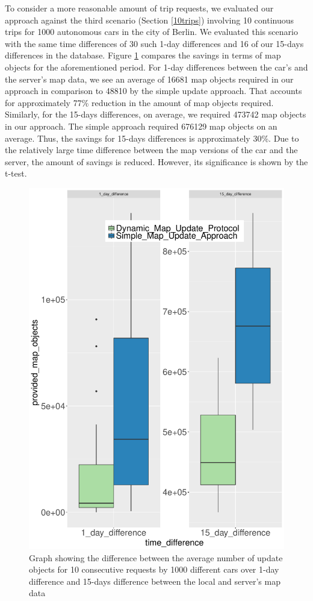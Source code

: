 To consider a more reasonable amount of trip requests, we evaluated our approach against the third scenario (Section \ref{10trips}) involving 10 continuous trips for 1000 autonomous cars in the city of Berlin. We evaluated this scenario with the same time differences of 30 such 1-day differences and 16 of our 15-days differences in the database. Figure \ref{fg:ber10x1000mo} compares the savings in terms of map objects for the aforementioned period. For 1-day differences between the car's and the server's map data, we see an average of 16681 map objects required in our approach in comparison to 48810 by the simple update approach. That accounts for approximately 77\% reduction in the amount of map objects required. Similarly, for the 15-days differences, on average, we required 473742 map objects in our approach. The simple approach required 676129 map objects on an average. Thus, the savings for 15-days differences is approximately 30\%. Due to the relatively large time difference between the map versions of the car and the server, the amount of savings is reduced. However, its significance is shown by the t-test.  

\begin{figure}
\centering
\includegraphics[scale=.7]{MapObjects1dvs15DPLast.pdf}
\caption{Graph showing the difference between the average number of update objects for 10 consecutive requests by 1000 different cars over 1-day difference and 15-days difference between the local and server's map data }
\label{fg:ber10x1000mo}
\end{figure}

